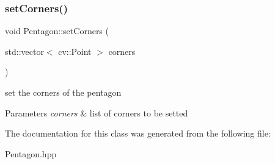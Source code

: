 \subsubsection{\texorpdfstring{set\+Corners()}{setCorners()}}
{\footnotesize\ttfamily void Pentagon\+::set\+Corners (\begin{DoxyParamCaption}\item[{std\+::vector$<$ cv\+::\+Point $>$}]{corners }\end{DoxyParamCaption})}

set the corners of the pentagon 
\begin{DoxyParams}{Parameters}
{\em corners} & list of corners to be setted \\
\hline
\end{DoxyParams}


The documentation for this class was generated from the following file\+:\begin{DoxyCompactItemize}
\item 
Pentagon.\+hpp\end{DoxyCompactItemize}
